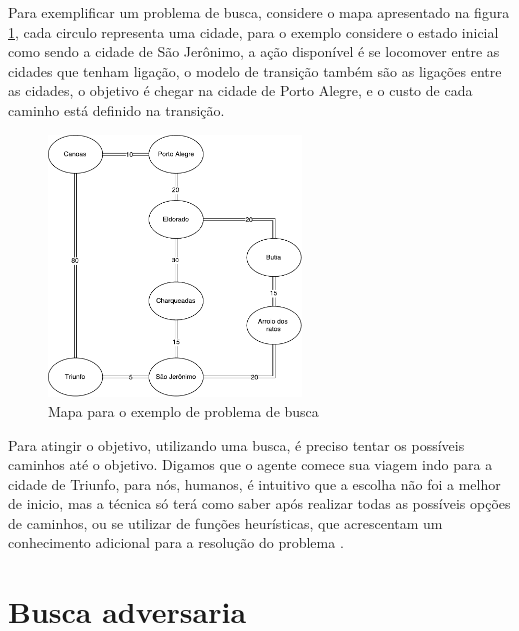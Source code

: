 Para exemplificar um problema de busca, considere o mapa apresentado na figura \ref{fig:mapabusca}, cada circulo representa uma cidade, para o exemplo considere o estado inicial como sendo a cidade de São Jerônimo, a ação disponível é se locomover entre as cidades que tenham ligação, o modelo de transição também são as ligações entre as cidades, o objetivo é chegar na cidade de Porto Alegre, e o custo de cada caminho está definido na transição. 

\begin{figure}[ht]
	\centering
	\includegraphics[width=0.6\textwidth]{fig/mapabusca.pdf}
	\caption{Mapa para o exemplo de problema de busca}
	\label{fig:mapabusca}
\end{figure} 

Para atingir o objetivo, utilizando uma busca, é preciso tentar os possíveis caminhos até o objetivo. Digamos que o agente comece sua viagem indo para a cidade de Triunfo, para nós, humanos, é intuitivo que a escolha não foi a melhor de inicio, mas a técnica só terá como saber após realizar todas as possíveis opções de caminhos, ou se utilizar de funções heurísticas, que acrescentam um conhecimento adicional para a resolução do problema \cite{intelligence2003modern}.

\section{Busca adversaria}

